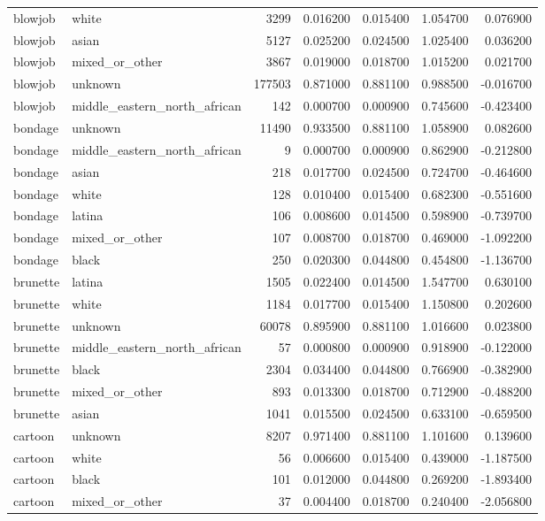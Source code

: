 \begin{tabular}{llrrrrr}
blowjob & white & 3299 & 0.016200 & 0.015400 & 1.054700 & 0.076900 \\
blowjob & asian & 5127 & 0.025200 & 0.024500 & 1.025400 & 0.036200 \\
blowjob & mixed_or_other & 3867 & 0.019000 & 0.018700 & 1.015200 & 0.021700 \\
blowjob & unknown & 177503 & 0.871000 & 0.881100 & 0.988500 & -0.016700 \\
blowjob & middle_eastern_north_african & 142 & 0.000700 & 0.000900 & 0.745600 & -0.423400 \\
bondage & unknown & 11490 & 0.933500 & 0.881100 & 1.058900 & 0.082600 \\
bondage & middle_eastern_north_african & 9 & 0.000700 & 0.000900 & 0.862900 & -0.212800 \\
bondage & asian & 218 & 0.017700 & 0.024500 & 0.724700 & -0.464600 \\
bondage & white & 128 & 0.010400 & 0.015400 & 0.682300 & -0.551600 \\
bondage & latina & 106 & 0.008600 & 0.014500 & 0.598900 & -0.739700 \\
bondage & mixed_or_other & 107 & 0.008700 & 0.018700 & 0.469000 & -1.092200 \\
bondage & black & 250 & 0.020300 & 0.044800 & 0.454800 & -1.136700 \\
brunette & latina & 1505 & 0.022400 & 0.014500 & 1.547700 & 0.630100 \\
brunette & white & 1184 & 0.017700 & 0.015400 & 1.150800 & 0.202600 \\
brunette & unknown & 60078 & 0.895900 & 0.881100 & 1.016600 & 0.023800 \\
brunette & middle_eastern_north_african & 57 & 0.000800 & 0.000900 & 0.918900 & -0.122000 \\
brunette & black & 2304 & 0.034400 & 0.044800 & 0.766900 & -0.382900 \\
brunette & mixed_or_other & 893 & 0.013300 & 0.018700 & 0.712900 & -0.488200 \\
brunette & asian & 1041 & 0.015500 & 0.024500 & 0.633100 & -0.659500 \\
cartoon & unknown & 8207 & 0.971400 & 0.881100 & 1.101600 & 0.139600 \\
cartoon & white & 56 & 0.006600 & 0.015400 & 0.439000 & -1.187500 \\
cartoon & black & 101 & 0.012000 & 0.044800 & 0.269200 & -1.893400 \\
cartoon & mixed_or_other & 37 & 0.004400 & 0.018700 & 0.240400 & -2.056800 \\

\end{tabular}
